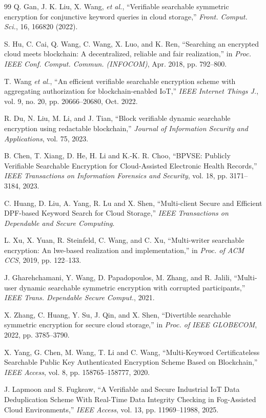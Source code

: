 \documentclass{ieeetj}
\theoremstyle{ieee-style}
\begin{document}
\begin{thebibliography}{99}
Q. Gan, J. K. Liu, X. Wang, \emph{et al.}, “Verifiable searchable symmetric encryption for conjunctive keyword queries in cloud storage,” \emph{Front. Comput. Sci.}, 16, 166820 (2022).

S. Hu, C. Cai, Q. Wang, C. Wang, X. Luo, and K. Ren, “Searching an encrypted cloud meets blockchain: A decentralized, reliable and fair realization,” in \emph{Proc. IEEE Conf. Comput. Commun. (INFOCOM)}, Apr. 2018, pp. 792–800.

T. Wang \emph{et al.}, “An efficient verifiable searchable encryption scheme with aggregating authorization for blockchain-enabled IoT,” \emph{IEEE Internet Things J.}, vol. 9, no. 20, pp. 20666–20680, Oct. 2022.

R. Du, N. Liu, M. Li, and J. Tian, “Block verifiable dynamic searchable encryption using redactable blockchain,” \emph{Journal of Information Security and Applications}, vol. 75, 2023.

B. Chen, T. Xiang, D. He, H. Li and K.-K. R. Choo, “BPVSE: Publicly Verifiable Searchable Encryption for Cloud-Assisted Electronic Health Records,” \emph{IEEE Transactions on Information Forensics and Security}, vol. 18, pp. 3171–3184, 2023.

C. Huang, D. Liu, A. Yang, R. Lu and X. Shen, “Multi-client Secure and Efficient DPF-based Keyword Search for Cloud Storage,” \emph{IEEE Transactions on Dependable and Secure Computing}.

L. Xu, X. Yuan, R. Steinfeld, C. Wang, and C. Xu, “Multi-writer searchable encryption: An lwe-based realization and implementation,” in \emph{Proc. of ACM CCS}, 2019, pp. 122–133.

J. Gharehchamani, Y. Wang, D. Papadopoulos, M. Zhang, and R. Jalili, “Multi-user dynamic searchable symmetric encryption with corrupted participants,” \emph{IEEE Trans. Dependable Secure Comput.}, 2021.

X. Zhang, C. Huang, Y. Su, J. Qin, and X. Shen, “Divertible searchable symmetric encryption for secure cloud storage,” in \emph{Proc. of IEEE GLOBECOM}, 2022, pp. 3785–3790.

X. Yang, G. Chen, M. Wang, T. Li and C. Wang, “Multi-Keyword Certificateless Searchable Public Key Authenticated Encryption Scheme Based on Blockchain,” \emph{IEEE Access}, vol. 8, pp. 158765–158777, 2020.

J. Lapmoon and S. Fugkeaw, “A Verifiable and Secure Industrial IoT Data Deduplication Scheme With Real-Time Data Integrity Checking in Fog-Assisted Cloud Environments,” \emph{IEEE Access}, vol. 13, pp. 11969–11988, 2025.


\end{thebibliography}
\end{document}
